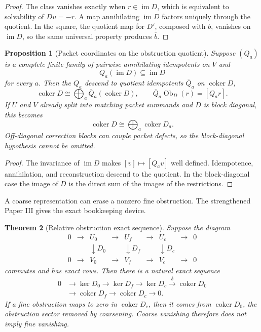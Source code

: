 \documentclass[11pt]{article}
\newtheorem{theorem}{Theorem}[section]
\newtheorem{proposition}[theorem]{Proposition}
\theoremstyle{definition}
\theoremstyle{remark}
\DeclareMathOperator{\coker}{coker}
\DeclareMathOperator{\im}{im}
\DeclareMathOperator{\Ob}{Ob}
\begin{document}
\begin{proof}
The class vanishes exactly when \(r\in\im D\), which is equivalent to solvability of \(Du=-r\).  A map annihilating \(\im D\) factors uniquely through the quotient.  In the square, the quotient map for \(D'\), composed with \(b\), vanishes on \(\im D\), so the same universal property produces \(\overline b\).
\end{proof}

\begin{proposition}[Packet coordinates on the obstruction quotient]
\label{prop:block02-obstruction-packets}
Suppose \((Q_a)\) is a complete finite family of pairwise annihilating idempotents on \(V\) and
\[
Q_a(\im D)\subseteq\im D
\]
for every \(a\).  Then the \(Q_a\) descend to quotient idempotents \(\overline Q_a\) on \(\coker D\),
\[
\coker D
\cong
\bigoplus_a\overline Q_a(\coker D),
\qquad
\overline Q_a\Ob_D(r)=[Q_ar].
\]
If \(U\) and \(V\) already split into matching packet summands and \(D\) is block diagonal, this becomes
\[
\coker D\cong\bigoplus_a\coker D_a.
\]
Off-diagonal correction blocks can couple packet defects, so the block-diagonal hypothesis cannot be omitted.
\end{proposition}

\begin{proof}
The invariance of \(\im D\) makes \([v]\mapsto[Q_av]\) well defined.  Idempotence, annihilation, and reconstruction descend to the quotient.  In the block-diagonal case the image of \(D\) is the direct sum of the images of the restrictions.
\end{proof}

A coarse representation can erase a nonzero fine obstruction.  The strengthened Paper III gives the exact bookkeeping device.

\begin{theorem}[Relative obstruction exact sequence]
\label{thm:block02-relative-obstruction-sequence}
Suppose the diagram
\[
\begin{array}{ccccccccc}
0&\to&U_0&\to&U_f&\to&U_c&\to&0\\
 &&\downarrow D_0&&\downarrow D_f&&\downarrow D_c\\
0&\to&V_0&\to&V_f&\to&V_c&\to&0
\end{array}
\]
commutes and has exact rows.  Then there is a natural exact sequence
\[
\begin{aligned}
0&\longrightarrow\ker D_0
\longrightarrow\ker D_f
\longrightarrow\ker D_c
\xrightarrow{\delta}\coker D_0\\
&\longrightarrow\coker D_f
\longrightarrow\coker D_c
\longrightarrow0.
\end{aligned}
\]
If a fine obstruction maps to zero in \(\coker D_c\), then it comes from \(\coker D_0\), the obstruction sector removed by coarsening.  Coarse vanishing therefore does not imply fine vanishing.
\end{theorem}
\end{document}

